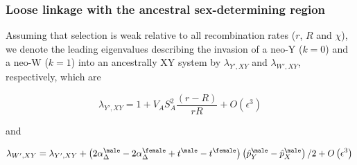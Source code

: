 \documentclass[12pt]{article}
\begin{document}
\subsubsection*{Loose linkage with the ancestral sex-determining region}



Assuming that selection is weak relative to all recombination rates ($r$, $R$ and $\chi$), we denote the leading eigenvalues describing the invasion of a neo-Y ($k=0$) and a neo-W ($k=1$) into an ancestrally XY system by $\lambda_{Y',XY}$ and $\lambda_{W',XY}$, respectively, which are

\begin{equation}
\lambda_{Y',XY} =1+ V_{A}S_{A}^2\frac{ \left( r-R \right) }{r R}+O\left(\epsilon^3 \right) 
\label{eq:lambda_neoY}
\end{equation}

\noindent 
and 

\begin{equation}
\lambda_{W',XY} =\lambda_{Y',XY}+\left(2\alpha_{\Delta}^\male-2\alpha_{\Delta}^\female+t^\male-t^\female \right) \left( \hat{p}^\male_Y-\hat{p}^\male_X \right)/2
+O\left(\epsilon^3 \right) \\
\label{eq:lambda_neoW}
\end{equation}
\end{document}
